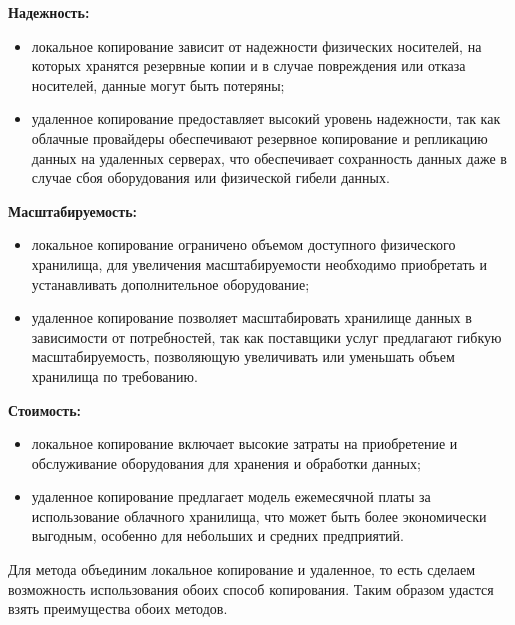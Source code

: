 \begin{flushleft}
\textbf{Надежность:}
\end{flushleft}

\begin{itemize}
\item локальное копирование зависит от надежности физических носителей, на которых хранятся резервные копии и в случае повреждения или отказа носителей, данные могут быть потеряны;
\item удаленное копирование предоставляет высокий уровень надежности, так как облачные провайдеры обеспечивают резервное копирование и репликацию данных на удаленных серверах, что обеспечивает сохранность данных даже в случае сбоя оборудования или физической гибели данных.
\end{itemize}

\begin{flushleft}
\textbf{Масштабируемость:}
\end{flushleft}

\begin{itemize}
\item локальное копирование ограничено объемом доступного физического хранилища, для увеличения масштабируемости необходимо приобретать и устанавливать дополнительное оборудование;
\item удаленное копирование позволяет масштабировать хранилище данных в зависимости от потребностей, так как поставщики услуг предлагают гибкую масштабируемость, позволяющую увеличивать или уменьшать объем хранилища по требованию.
\end{itemize}

\begin{flushleft}
\textbf{Стоимость:}
\end{flushleft}

\begin{itemize}
\item локальное копирование включает высокие затраты на приобретение и обслуживание оборудования для хранения и обработки данных;
\item удаленное копирование предлагает модель ежемесячной платы за использование облачного хранилища, что может быть более экономически выгодным, особенно для небольших и средних предприятий.
\end{itemize}


Для метода объединим локальное копирование и удаленное, то есть сделаем возможность использования обоих способ копирования. Таким образом удастся взять преимущества обоих методов.


